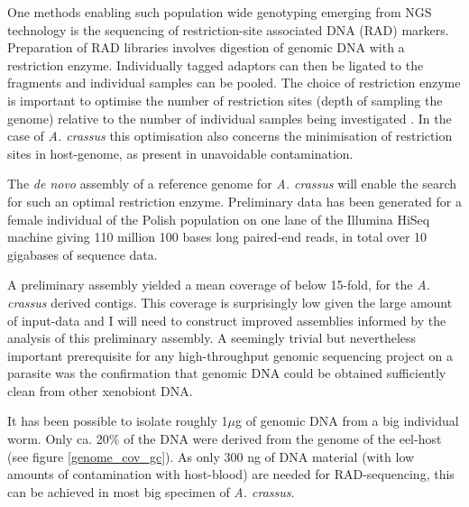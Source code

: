 One methods enabling such population wide genotyping emerging from NGS
technology is the sequencing of restriction-site associated DNA (RAD)
markers. Preparation of RAD libraries involves digestion of genomic
DNA with a restriction enzyme. Individually tagged adaptors can then
be ligated to the fragments and individual samples can be pooled. The
choice of restriction enzyme is important to optimise the number of
restriction sites (depth of sampling the genome) relative to the
number of individual samples being investigated
\cite{pmid18852878}. In the case of \textit{A. crassus} this
optimisation also concerns the minimisation of restriction sites in
host-genome, as present in unavoidable contamination. 

The \textit{de novo} assembly of a reference genome for
\textit{A. crassus} will enable the search for such an optimal
restriction enzyme. Preliminary data has been generated for a female
individual of the Polish population on one lane of the Illumina HiSeq
machine giving 110 million 100 bases long paired-end reads, in total
over 10 gigabases of sequence data.

A preliminary assembly yielded a mean coverage of below 15-fold, for
the \textit{A. crassus} derived contigs. This coverage is surprisingly
low given the large amount of input-data and I will need to construct
improved assemblies informed by the analysis of this preliminary
assembly. A seemingly trivial but nevertheless important prerequisite
for any high-throughput genomic sequencing project on a parasite was
the confirmation that genomic DNA could be obtained sufficiently clean
from other xenobiont DNA.


It has been possible to isolate roughly 1$\mu$g of genomic DNA from a
big individual worm. Only ca. 20\% of the DNA were derived from the
genome of the eel-host (see figure \ref{genome_cov_gc}). As only 300
ng of DNA material (with low amounts of contamination with host-blood)
are needed for RAD-sequencing, this can be achieved in most big
specimen of \textit{A. crassus}.

